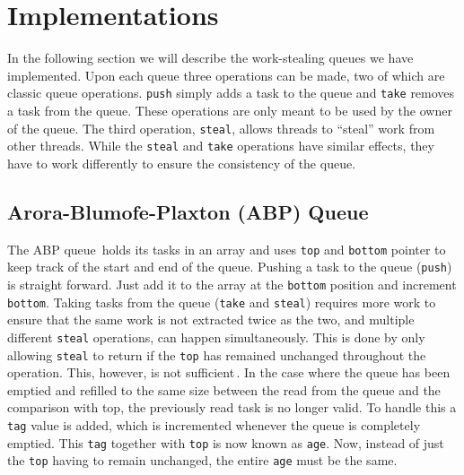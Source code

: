 \section{Implementations}
\label{sec:implementations}
In the following section we will describe the work-stealing queues we have implemented. Upon each queue three operations can be made, two of which are classic queue operations. \texttt{push} simply adds a task to the queue and \texttt{take} removes a task from the queue. These operations are only meant to be used by the owner of the queue. The third operation, \texttt{steal}, allows threads to ``steal'' work from other threads. While the \texttt{steal} and \texttt{take} operations have similar effects, they have to work differently to ensure the consistency of the queue.

\subsection{Arora-Blumofe-Plaxton (ABP) Queue}
The ABP queue\,\cite{Arora:1998:TSM:277651.277678} holds its tasks in an array and uses \texttt{top} and \texttt{bottom} pointer to keep track of the start and end of the queue. Pushing a task to the queue (\texttt{push}) is straight forward. Just add it to the array at the \texttt{bottom} position and increment \texttt{bottom}. Taking tasks from the queue (\texttt{take} and \texttt{steal}) requires more work to ensure that the same work is not extracted twice as the two, and multiple different \texttt{steal} operations, can happen simultaneously. This is done by only allowing \texttt{steal} to return if the \texttt{top} has remained unchanged throughout the operation. This, however, is not sufficient\,\cite[p. 4]{Arora:1998:TSM:277651.277678}. In the case where the queue has been emptied and refilled to the same size between the read from the queue and the comparison with top, the previously read task is no longer valid. To handle this a \texttt{tag} value is added, which is incremented whenever the queue is completely emptied. This \texttt{tag} together with \texttt{top} is now known as \texttt{age}. Now, instead of just the \texttt{top} having to remain unchanged, the entire \texttt{age} must be the same.

